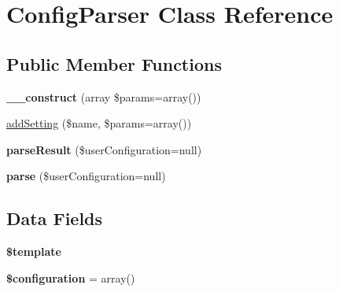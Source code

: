 \hypertarget{class_hypo_conf_1_1_config_parser}{
\section{\-Config\-Parser \-Class \-Reference}
\label{class_hypo_conf_1_1_config_parser}
}
\subsection*{\-Public \-Member \-Functions}
\begin{DoxyCompactItemize}
\item 
\hypertarget{class_hypo_conf_1_1_config_parser_a85ac5b7f54ad67ec6b5b9dc282717602}{
{\bfseries \-\_\-\-\_\-construct} (array \$params=array())}
\label{class_hypo_conf_1_1_config_parser_a85ac5b7f54ad67ec6b5b9dc282717602}

\item 
\hyperlink{class_hypo_conf_1_1_config_parser_ae03731b7b23af731256f6502c308193a}{add\-Setting} (\$name, \$params=array())
\item 
\hypertarget{class_hypo_conf_1_1_config_parser_a23c674543d1d8d0ea0151b9172a8fd6a}{
{\bfseries parse\-Result} (\$user\-Configuration=null)}
\label{class_hypo_conf_1_1_config_parser_a23c674543d1d8d0ea0151b9172a8fd6a}

\item 
\hypertarget{class_hypo_conf_1_1_config_parser_a6b313d54e051724d81600661b8337fce}{
{\bfseries parse} (\$user\-Configuration=null)}
\label{class_hypo_conf_1_1_config_parser_a6b313d54e051724d81600661b8337fce}

\end{DoxyCompactItemize}
\subsection*{\-Data \-Fields}
\begin{DoxyCompactItemize}
\item 
\hypertarget{class_hypo_conf_1_1_config_parser_aa3e9534005fd516d941f6a5569896e01}{
{\bfseries \$template}}
\label{class_hypo_conf_1_1_config_parser_aa3e9534005fd516d941f6a5569896e01}

\item 
\hypertarget{class_hypo_conf_1_1_config_parser_ab2a3e8712b2462d01e8ebacaa08bafa7}{
{\bfseries \$configuration} = array()}
\label{class_hypo_conf_1_1_config_parser_ab2a3e8712b2462d01e8ebacaa08bafa7}

\end{DoxyCompactItemize}
